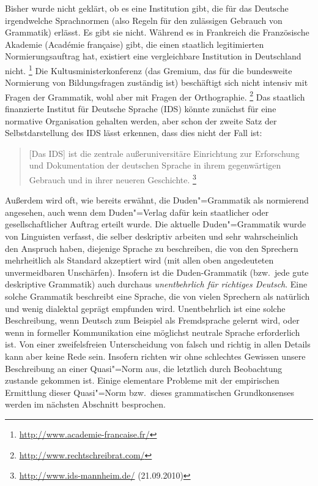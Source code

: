 Bisher wurde nicht geklärt, ob es eine Institution gibt, die für das Deutsche irgendwelche Sprachnormen (also Regeln für den zulässigen Gebrauch von Grammatik) erlässt.
Es gibt sie nicht.
Während es \zB in Frankreich die Französische Akademie (Académie française) gibt, die einen staatlich legitimierten Normierungsauftrag hat, existiert eine vergleichbare Institution in Deutschland nicht.%
\footnote{\raggedright{\url{http://www.academie-francaise.fr/}}}
Die Kultusministerkonferenz (das Gremium, das für die bundesweite Normierung von Bildungsfragen zuständig ist) beschäftigt sich nicht intensiv mit Fragen der Grammatik, wohl aber mit Fragen der Orthographie.%
\footnote{\url{http://www.rechtschreibrat.com/}}
Das staatlich finanzierte Institut für Deutsche Sprache (IDS) könnte zunächst für eine normative Organisation gehalten werden, aber schon der zweite Satz der Selbstdarstellung des IDS lässt erkennen, dass dies nicht der Fall ist:

\begin{quote}
  [Das IDS] ist die zentrale außeruniversitäre Einrichtung zur Erforschung und Dokumentation der deutschen Sprache in ihrem gegenwärtigen Gebrauch und in ihrer neueren Geschichte.%
    \footnote{\raggedright{\url{http://www.ids-mannheim.de/} (21.09.2010)}}
\end{quote}

Außerdem wird oft, wie bereits erwähnt, die Duden"=Grammatik als normierend angesehen, auch wenn dem Duden"=Verlag dafür kein staatlicher oder gesellschaftlicher Auftrag erteilt wurde.
Die aktuelle Duden"=Grammatik wurde von Linguisten verfasst, die selber deskriptiv arbeiten und sehr wahrscheinlich den Anspruch haben, diejenige Sprache zu beschreiben, die von den Sprechern mehrheitlich als Standard akzeptiert wird (mit allen oben angedeuteten unvermeidbaren Unschärfen).
Insofern ist die Duden-Grammatik (bzw.\ jede gute deskriptive Grammatik) auch durchaus \textit{unentbehrlich für richtiges Deutsch}.
Eine solche Grammatik beschreibt eine Sprache, die von vielen Sprechern als natürlich und wenig dialektal geprägt empfunden wird.
Unentbehrlich ist eine solche Beschreibung, wenn Deutsch zum Beispiel als Fremdsprache gelernt wird, oder wenn in formeller Kommunikation eine möglichst neutrale Sprache erforderlich ist.
Von einer zweifelsfreien Unterscheidung von falsch und richtig in allen Details kann aber keine Rede sein.
Insofern richten wir ohne schlechtes Gewissen unsere Beschreibung an einer Quasi"=Norm aus, die letztlich durch Beobachtung zustande gekommen ist.
Einige elementare Probleme mit der empirischen Ermittlung dieser Quasi"=Norm bzw.\ dieses grammatischen Grundkonsenses werden im nächsten Abschnitt besprochen.

